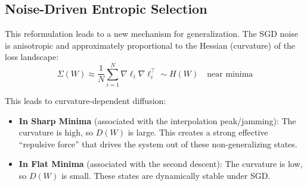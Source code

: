 \documentclass[
  journal=largetwo,
  year=2025,
  volume=37,
]{cup-journal}
\begin{document}
\subsection{Noise-Driven Entropic Selection}

This reformulation leads to a new mechanism for generalization. The SGD noise is anisotropic and approximately proportional to the Hessian (curvature) of the loss landscape:
\begin{equation}
    \Sigma(W) \approx \frac{1}{N} \sum_{i=1}^N \nabla \ell_i \nabla \ell_i^\top \sim H(W) \quad \text{near minima}
\end{equation}

This leads to curvature-dependent diffusion:
\begin{itemize}
    \item \textbf{In Sharp Minima} (associated with the interpolation peak/jamming): The curvature is high, so $D(W)$ is large. This creates a strong effective ``repulsive force'' that drives the system out of these non-generalizing states.
    
    \item \textbf{In Flat Minima} (associated with the second descent): The curvature is low, so $D(W)$ is small. These states are dynamically stable under SGD.
\end{itemize}
\end{document}
